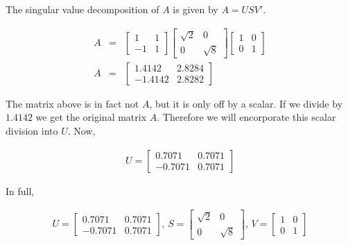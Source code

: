 The singular value decomposition of \(A\) is given by \(A = USV'\).

\begin{eqnarray}
  A &=& 
  \begin{bmatrix}
    1 & 1 \\
    -1 & 1
  \end{bmatrix}
  \begin{bmatrix}
    \sqrt{2} & 0 \\
    0 & \sqrt{8}
  \end{bmatrix}
  \begin{bmatrix}
    1 & 0 \\
    0 & 1
  \end{bmatrix}
  \\
  A &=&
  \begin{bmatrix}
    1.4142 & 2.8284 \\
    -1.4142 & 2.8282
  \end{bmatrix}
\end{eqnarray}

The matrix above is in fact not \(A\), but it is only off by a scalar. If we divide by \(1.4142\) we get the original matrix \(A\). Therefore we will encorporate this scalar division into \(U\). Now,

\begin{eqnarray}
  U = 
  \begin{bmatrix}
    0.7071 & 0.7071 \\
    -0.7071 & 0.7071
  \end{bmatrix}
\end{eqnarray}

In full,

\begin{eqnarray}
  U = 
  \begin{bmatrix}
    0.7071 & 0.7071 \\
    -0.7071 & 0.7071
  \end{bmatrix}
  \text{, }
  S = 
  \begin{bmatrix}
    \sqrt{2} & 0 \\
    0 & \sqrt{8}
  \end{bmatrix}
  \text{, }
  V = 
  \begin{bmatrix}
    1 & 0 \\
    0 & 1
  \end{bmatrix}
\end{eqnarray}



